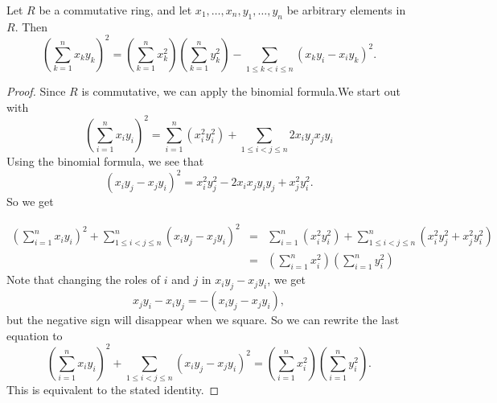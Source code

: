 \documentclass[12pt]{article}
\begin{document}
Let $R$ be a commutative ring, and let
$x_1, \ldots, x_n, y_1, \ldots, y_n$ be arbitrary elements in $R$. Then
\[\left(\sum_{k=1}^n x_ky_k\right)^2 =\left(\sum_{k=1}^n x_k^2\right)\left(\sum_{k=1}^n
y_k^2\right)
- \sum_{1 \le k < i \le n} (x_ky_i -x_iy_k)^2\mbox{.}\]

\begin{proof}
Since $R$ is commutative, we can apply the binomial formula.We start out with
\begin{equation}
\left(\sum_{i=1}^n x_iy_i\right)^2 =\sum_{i=1}^n (x_i^2y_i^2) +\sum_{1
\leq i< j\leq n} 2 x_iy_jx_jy_i
\end{equation}
Using the binomial formula, we see that
\[(x_iy_j -x_jy_i)^2 =x_i^2y_j^2 -2x_ix_jy_iy_j +x_j^2y_i^2.\]
So we get

\begin{eqnarray}
\left(\sum\limits_{i=1}^n x_iy_i\right)^2 +\sum\limits_{1
\leq i< j\leq n}^n(x_iy_j -x_jy_i)^2
&=&\sum\limits_{i=1}^n \left(x_i^2y_i^2\right) +\sum\limits_{1
\leq i< j\leq n}^n \left(x_i^2y_j^2
+x_j^2y_i^2\right)  \\
&=&\left(\sum\limits_{i=1}^n x_i^2\right)\left(\sum\limits_{i=1}^n y_i^2\right)
\end{eqnarray}
Note that changing the roles of $i$ and $j$ in $x_iy_j -x_jy_i$, we get
\[x_jy_i -x_iy_j =-(x_iy_j -x_jy_i),\]
but the negative sign will disappear when we square. So we can rewrite the last equation to
\begin{equation}
\left(\sum\limits_{i=1}^n x_iy_i\right)^2 +\sum\limits_{1 \le i <j \le n} (x_iy_j -x_jy_i)^2
=\left(\sum_{i=1}^n x_i^2\right)\left(\sum_{i=1}^n y_i^2\right).
\end{equation}
This is equivalent to the stated identity.
\end{proof}
\end{document}
